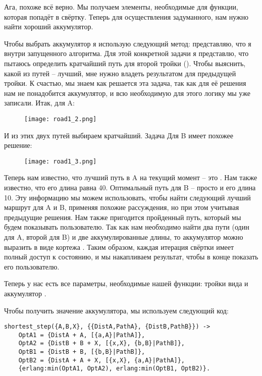 Ага, похоже всё верно.
Мы получаем элементы, необходимые для функции, которая попадёт в свёртку.
Теперь для осуществления задуманного, нам нужно найти хороший аккумулятор.

Чтобы выбрать аккумулятор я использую следующий метод: представляю, что я внутри запущенного алгоритма.
Для этой конкретной задачи я представлю, что пытаюсь определить кратчайший путь для второй тройки ().
Чтобы выяснить, какой из путей \--- лучший, мне нужно владеть результатом для предыдущей тройки.
К счастью, мы знаем как решается эта задача, так как для её решения нам не понадобится аккумулятор, и всю необходимую для этого логику мы уже записали.
Итак, для A:
\begin{figure}[h!]
    \texttt{[image: road1\_2.png]}
\end{figure}

И из этих двух путей выбираем кратчайший.
\clearpage
Задача Для B имеет похожее решение:
\begin{figure}[!htbp]
    \texttt{[image: road1\_3.png]}
\end{figure}

Теперь нам известно, что лучший путь в A на текущий момент \--- это \ops{[B,X]}.
Нам также известно, что его длина равна 40.
Оптимальный путь для B \--- просто \ops{[B]} и его длина 10.
Эту информацию мы можем использовать, чтобы найти следующий лучший маршрут для A и B, применяя похожие рассуждения, но при этом учитывая предыдущие решения.
Нам также пригодится пройденный путь, который мы будем показывать пользователю.
Так как нам необходимо найти два пути (один для A, второй для B) и две аккумулированные длины, то аккумулятор можно выразить в виде кортежа .
Таким образом, каждая итерация свёртки имеет полный доступ к состоянию, и мы накапливаем результат, чтобы в конце показать его пользователю.

Теперь у нас есть все параметры, необходимые нашей функции: тройки вида  и аккумулятор .

Чтобы получить значение аккумулятора, мы используем следующий код:
\begin{lstlisting}[style=erlang]
shortest_step({A,B,X}, {{DistA,PathA}, {DistB,PathB}}) ->
    OptA1 = {DistA + A, [{a,A}|PathA]},
    OptA2 = {DistB + B + X, [{x,X}, {b,B}|PathB]},
    OptB1 = {DistB + B, [{b,B}|PathB]},
    OptB2 = {DistA + A + X, [{x,X}, {a,A}|PathA]},
    {erlang:min(OptA1, OptA2), erlang:min(OptB1, OptB2)}.
\end{lstlisting}

